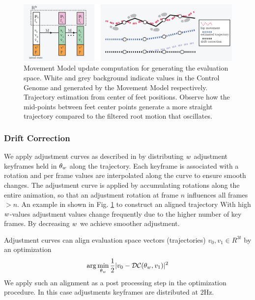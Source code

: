 \begin{figure}
    \centering
    \includegraphics[width=1\columnwidth]{img/trajectory.png}
    \caption{Movement Model update computation for generating the evaluation space. White and grey background indicate values in the Control Genome and generated by the Movement Model respectively.  Trajectory estimation from center of feet positions. Observe how the mid-points between feet center points generate a more straight trajectory compared to the filtered root motion that oscillates.}
    \label{fig:method:trajectory}
\end{figure}

\subsubsection{\bf Drift Correction} 
We apply adjustment curves as described in \citep{lowe16} by distributing ${w}$ adjustment keyframes held in $\theta_{w}$ along the trajectory.  Each keyframe is associated with a rotation and per frame values are interpolated along the curve to ensure smooth changes. The adjustment curve is applied by accumulating rotations along the entire animation, so that an adjustment rotation at frame $n$ influences all frames $>n$. An example in shown in Fig. \ref{fig:method:trajectory} to construct an aligned trajectory With high ${w}$-values adjustment values change frequently due to the higher number of key frames. By decreasing ${w}$ we achieve smoother adjustment. 

Adjustment curves can align evaluation space vectors (trajectories) $v_0,v_1\in R^{3t}$ by an optimization
\begin{subequations}
\begin{align}
    \arg\min_{\theta_{w}}{
        \frac{1}{2}|v_0-\mathcal{DC}(\theta_{w},v_1)|^2
    }
\end{align}
\end{subequations}
We apply such an alignment as a post processing step in the optimization procedure. In this case adjustments keyframes are distributed at 2Hz. 

